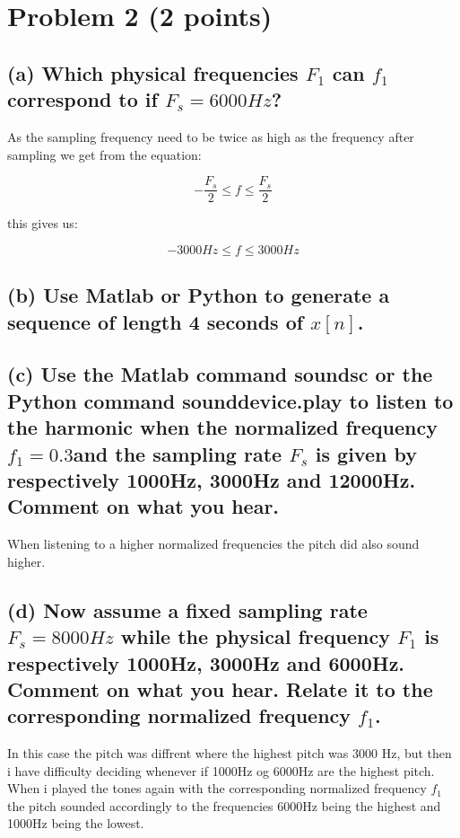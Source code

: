 \section{Problem 2 (2 points)}

\subsection*{(a) Which physical frequencies $F_1$ can $f_1$ correspond to if $F_s = 6000Hz$?}
As the sampling frequency need to be twice as high as the frequency after sampling we get from the equation:

\begin{equation*}
    -\frac{F_s}{2}\leq f \leq \frac{F_s}{2}
\end{equation*}

this gives us:

\begin{equation*}
    -3000Hz\leq f \leq 3000Hz
\end{equation*}


\subsection*{(b)  Use Matlab or Python to generate a sequence of length 4 seconds of $x[n]$.}

\subsection*{(c)  Use the Matlab command soundsc or the Python command sounddevice.play to listen to the harmonic when the normalized frequency $f_1 = 0.3 $and the sampling rate $F_s$ is given by respectively 1000Hz, 3000Hz and 12000Hz.
Comment on what you hear.}

When listening to a higher normalized frequencies the pitch did also sound higher.

\subsection*{(d) Now assume a fixed sampling rate $F_s = 8000Hz$ while the physical frequency $F_1$ is respectively 1000Hz, 3000Hz and 6000Hz. Comment on what you hear. Relate it to the corresponding normalized frequency $f_1$.}

In this case the pitch was diffrent where the highest pitch was 3000 Hz, but then i have difficulty deciding whenever if 1000Hz og 6000Hz are the highest pitch. When i played the tones again with the corresponding normalized frequency $f_1$ the pitch sounded accordingly to the frequencies 6000Hz being the highest and 1000Hz being the lowest.
